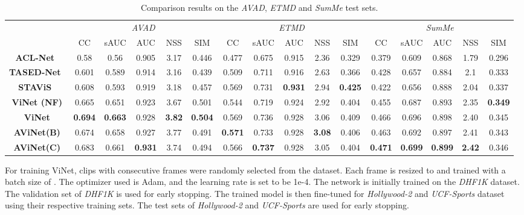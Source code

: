 \documentclass[letterpaper, 10 pt, conference]{ieeeconf}  \usepackage{times}
\begin{document}
\begin{table*}[t]
\footnotesize
\begin{center}

\begin{tabular}{|c|ccccc|ccccc|ccccc|}
\hline
 & \multicolumn{5}{c|}{\emph{AVAD}} & \multicolumn{5}{c|}{\emph{ETMD}} & \multicolumn{5}{c|}{\emph{SumMe}} \\
 & CC & sAUC & AUC & NSS & SIM & CC & sAUC & AUC & NSS & SIM & CC & sAUC & AUC & NSS & SIM \\ 
 \hline\hline
\textbf{ACL-Net}~\cite{wang2019revisiting} & 0.58 & 0.56 & 0.905 & 3.17 & 0.446 & 0.477 & 0.675 & 0.915 & 2.36 & 0.329 & 0.379 & 0.609 & 0.868 & 1.79 & 0.296 \\
\textbf{TASED-Net}~\cite{min2019tased} & 0.601 & 0.589 & 0.914 & 3.16 & 0.439 & 0.509 & 0.711 & 0.916 & 2.63 & 0.366 & 0.428 & 0.657 & 0.884 & 2.1 & 0.333 \\
\textbf{STAViS}~\cite{tsiami2020stavis} & 0.608 & 0.593 & 0.919 & 3.18 & 0.457 & 0.569 & 0.731 & \textbf{0.931} & 2.94 & \textbf{0.425} & 0.422 & 0.656 & 0.888 & 2.04 & 0.337 \\ \hline
\textbf{ViNet (NF)} & 0.665 & 0.651 & 0.923 & 3.67 & 0.501 & 0.544 & 0.719 & 0.924 & 2.92 & 0.404 & 0.455 & 0.687 & 0.893 & 2.35 & \textbf{0.349} \\
\textbf{ViNet} & \textbf{0.694} & \textbf{0.663} & 0.928 & \textbf{3.82} & \textbf{0.504} & 0.569 & 0.736 & 0.928 & 3.06 & 0.409 & 0.466 & 0.696 & 0.898 & 2.40 & 0.345 \\
\textbf{AViNet(B)} & 0.674 & 0.658 & 0.927 & 3.77 & 0.491 &\textbf{0.571} & 0.733 & 0.928 & \textbf{3.08} & 0.406 & 0.463 & 0.692 & 0.897 & 2.41 & 0.343 \\
\textbf{AViNet(C)} & 0.683 & 0.661 & \textbf{0.931} & 3.74 & 0.494 & 0.566 & \textbf{0.737} & 0.928 & 3.05 & 0.404 & \textbf{0.471} & \textbf{0.699} & \textbf{0.899} & \textbf{2.42} & 0.346 \\ \hline
\end{tabular}
\end{center}
\caption{Comparison results on the \emph{AVAD}, \emph{ETMD} and \emph{SumMe} test sets.}
\label{table:audio_test_results2}
\end{table*}

For training ViNet, clips with  consecutive frames were randomly selected from the dataset. Each frame is resized to  and trained with a batch size of . The optimizer used is Adam, and the learning rate is set to be 1e-4. The network is initially trained on the \emph{DHF1K} dataset. The validation set of \emph{DHF1K} is used for early stopping. The trained model is then fine-tuned for \emph{Hollywood-2} and \emph{UCF-Sports} dataset using their respective training sets. The test sets of \emph{Hollywood-2} and \emph{UCF-Sports} are used for early stopping.
\end{document}
